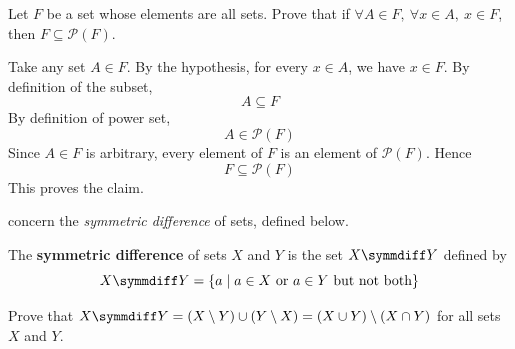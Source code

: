 \begin{chapex}
Let $F$ be a set whose elements are all sets. Prove that if $\forall A \in F,~ \forall x \in A,~ x \in F$, then $F \subseteq \mathcal{P}(F)$.
\end{chapex}

\begin{myproof}
Take any set $A \in F$. By the hypothesis, for every $x \in A$, we have $x \in F$. By definition of the subset,
\[A \subseteq F\]
By definition of power set,
\[A \in \mathcal P(F)\]
Since $A \in F$ is arbitrary, every element of $F$ is an element of $\mathcal P(F)$. Hence
\[F \subseteq \mathcal P(F)\]
This proves the claim.
\end{myproof}

 concern the \textit{symmetric difference} of sets, defined below.

\begin{definition}
\label{defSymmetricDifference}
The \textbf{symmetric difference} of sets $X$ and $Y$ is the set $X \symmdiff Y$  defined by
\[ X \symmdiff Y = \{ a \mid a \in X \text{ or } a \in Y \text{ but not both} \} \]
\end{definition}

\begin{chapex}
\label{cqSymmetricDifferenceBegin}
\label{cqSymmetricDifferenceInTermsOfOtherSetOperations}
Prove that $X \symmdiff Y = (X \setminus Y) \cup (Y \setminus X) = (X \cup Y) \setminus (X \cap Y)$ for all sets $X$ and $Y$.
\end{chapex}

